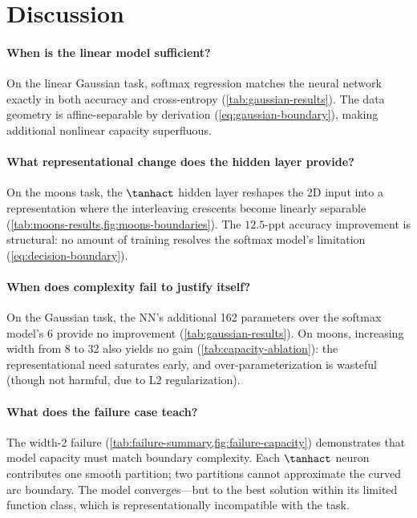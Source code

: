 \documentclass[sigconf,screen,nonacm]{acmart}
\begin{document}
\section{Discussion}

\paragraph{When is the linear model sufficient?}
On the linear Gaussian task, softmax regression matches the neural network exactly in both accuracy and cross-entropy (\cref{tab:gaussian-results}). The data geometry is affine-separable by derivation (\cref{eq:gaussian-boundary}), making additional nonlinear capacity superfluous.

\paragraph{What representational change does the hidden layer provide?}
On the moons task, the $\tanhact$ hidden layer reshapes the 2D input into a representation where the interleaving crescents become linearly separable (\cref{tab:moons-results,fig:moons-boundaries}). The $12.5$-ppt accuracy improvement is structural: no amount of training resolves the softmax model's limitation (\cref{eq:decision-boundary}).

\paragraph{When does complexity fail to justify itself?}
On the Gaussian task, the NN's additional 162 parameters over the softmax model's 6 provide no improvement (\cref{tab:gaussian-results}). On moons, increasing width from 8 to 32 also yields no gain (\cref{tab:capacity-ablation}): the representational need saturates early, and over-parameterization is wasteful (though not harmful, due to L2 regularization).

\paragraph{What does the failure case teach?}
The width-2 failure (\cref{tab:failure-summary,fig:failure-capacity}) demonstrates that model capacity must match boundary complexity. Each $\tanhact$ neuron contributes one smooth partition; two partitions cannot approximate the curved arc boundary. The model converges---but to the best solution within its limited function class, which is representationally incompatible with the task.
\end{document}
